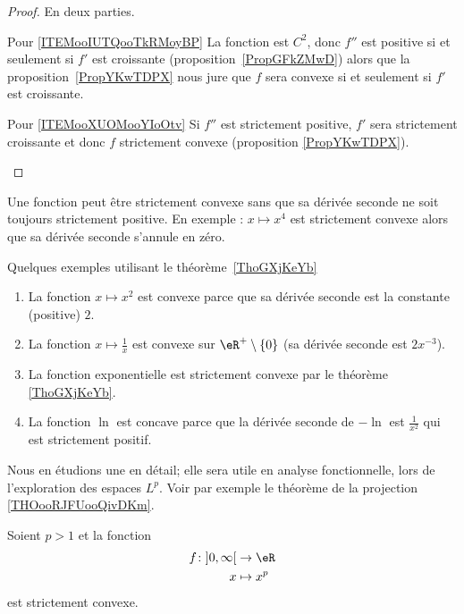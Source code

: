 \begin{proof}
    En deux parties.
    \begin{subproof}
    \item[Pour \ref{ITEMooIUTQooTkRMoyBP}]
        La fonction est \( C^2\), donc \( f''\) est positive si et seulement si \( f'\) est croissante (proposition~\ref{PropGFkZMwD}) alors que la proposition~\ref{PropYKwTDPX} nous jure que \( f\) sera convexe si et seulement si \( f'\) est croissante.
    \item[Pour \ref{ITEMooXUOMooYIoOtv}]
        Si \( f''\) est strictement positive, \( f'\) sera strictement croissante et donc \( f\) strictement convexe (proposition \ref{PropYKwTDPX}).
    \end{subproof}
\end{proof}

\begin{remark}      \label{REMooVRPQooIybxmp}
    Une fonction peut être strictement convexe sans que sa dérivée seconde ne soit toujours strictement positive. En exemple : \( x\mapsto x^4\) est strictement convexe alors que sa dérivée seconde s'annule en zéro.
\end{remark}

\begin{example} \label{ExPDRooZCtkOz}
    Quelques exemples utilisant le théorème~\ref{ThoGXjKeYb}
    \begin{enumerate}
        \item
            La fonction \( x\mapsto x^2\) est convexe parce que sa dérivée seconde est la constante (positive) \( 2\).
        \item
            La fonction \( x\mapsto\frac{1}{ x }\) est convexe sur \( \eR^+\setminus\{ 0 \}\) (sa dérivée seconde est \( 2x^{-3}\)).
        \item       \label{ITEMooRXSBooDBerbx}
            La fonction exponentielle est strictement convexe par le théorème \ref{ThoGXjKeYb}.
        \item
            La fonction \( \ln\) est concave parce que la dérivée seconde de \( -\ln\) est \( \frac{1}{ x^2 }\) qui est strictement positif.
    \end{enumerate}
\end{example}

Nous en étudions une en détail; elle sera utile en analyse fonctionnelle, lors de l'exploration des espaces \( L^p\). Voir par exemple le théorème de la projection \ref{THOooRJFUooQivDKm}.
\begin{lemma}       \label{LEMooSXTXooZOmtKq}
    Soient \( p>1\) et la fonction
    \begin{equation}
        \begin{aligned}
            f\colon \mathopen] 0 , \infty \mathclose[ & \to \eR       \\
                                  x                   & \mapsto x^p
        \end{aligned}
    \end{equation}
    est strictement convexe.
\end{lemma}

